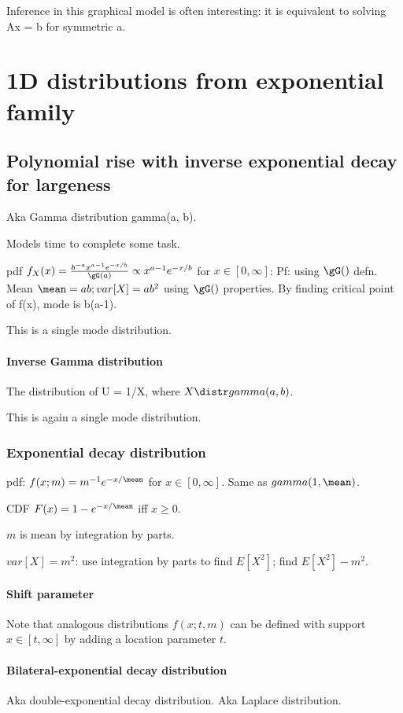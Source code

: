 \documentclass[oneside, article]{memoir}
\begin{document}
Inference in this graphical model is often interesting: it is equivalent to solving Ax = b for symmetric a.


\section{1D distributions from exponential family}
\subsection{Polynomial rise with inverse exponential decay for largeness}
Aka Gamma distribution gamma(a, b).

Models time to complete some task.

pdf $f_X(x) = \frac{b^{-a}x^{a-1}e^{-x/b}}{\gG(a)} \propto x^{a-1}e^{-x/b}$ for $x \in [0, \infty]$: Pf: using $\gG()$ defn. Mean $\mean = ab; var[X] = ab^{2}$ using $\gG()$ properties. By finding critical point of f(x), mode is b(a-1).

This is a single mode distribution.

\paragraph{Inverse Gamma distribution}
The distribution of U = 1/X, where $X \distr gamma(a, b)$.

This is again a single mode distribution.

\subsubsection{Exponential decay distribution }
pdf: $f(x; m) = m^{-1}e^{-x/\mean}$ for $x \in [0, \infty]$. Same as $gamma(1, \mean)$.

CDF $F(x) = 1 - e^{-x/\mean}$ iff $x\geq 0$.


$m$ is mean by integration by parts.

$var[X] = m^{2}$: use integration by parts to find $E[X^{2}]$; find $E[X^{2}] - m^{2}$.

\paragraph{Shift parameter}
Note that analogous distributions $f(x;t, m)$ can be defined with support $x \in [t, \infty]$ by adding a location parameter $t$.

\paragraph{Bilateral-exponential decay distribution}
Aka double-exponential decay distribution. Aka Laplace distribution.
\end{document}
